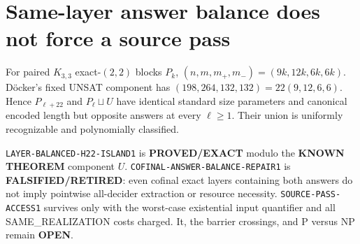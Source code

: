 \section{Same-layer answer balance does not force a source pass}
For paired $K_{3,3}$ exact-$(2,2)$ blocks $P_k$,
$(n,m,m_+,m_-)=(9k,12k,6k,6k)$.  D\"ocker's fixed UNSAT component has
$(198,264,132,132)=22(9,12,6,6)$.  Hence $P_{\ell+22}$ and
$P_\ell\sqcup U$ have identical standard size parameters and canonical
encoded length but opposite answers at every $\ell\ge1$.  Their union is
uniformly recognizable and polynomially classified.

\texttt{LAYER-BALANCED-H22-ISLAND1} is \textbf{PROVED/EXACT} modulo the
\textbf{KNOWN THEOREM} component $U$.
\texttt{COFINAL-ANSWER-BALANCE-REPAIR1} is
\textbf{FALSIFIED/RETIRED}: even cofinal exact layers containing both answers
do not imply pointwise all-decider extraction or resource necessity.
\texttt{SOURCE-PASS-ACCESS1} survives only with the worst-case existential
input quantifier and all SAME\_REALIZATION costs charged.  It, the barrier
crossings, and P versus NP remain \textbf{OPEN}.


